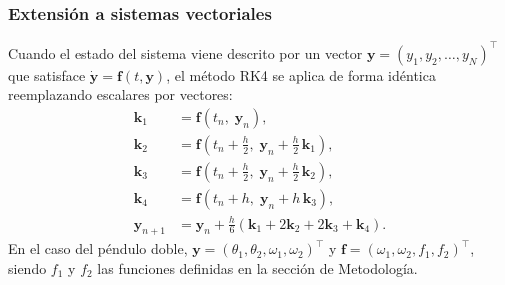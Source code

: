 \documentclass[10pt,onecolumn]{article}
\begin{document}
\subsubsection*{Extensión a sistemas vectoriales}

Cuando el estado del sistema viene descrito por un vector $\mathbf{y} = (y_1, y_2, \ldots, y_N)^{\!\top}$ que satisface $\dot{\mathbf{y}} = \mathbf{f}(t, \mathbf{y})$, el método RK4 se aplica de forma idéntica reemplazando escalares por vectores:
\begin{align}
    \mathbf{k}_1 &= \mathbf{f}(t_n,\; \mathbf{y}_n), \\
    \mathbf{k}_2 &= \mathbf{f}\!\left(t_n + \tfrac{h}{2},\; \mathbf{y}_n + \tfrac{h}{2}\,\mathbf{k}_1\right), \\
    \mathbf{k}_3 &= \mathbf{f}\!\left(t_n + \tfrac{h}{2},\; \mathbf{y}_n + \tfrac{h}{2}\,\mathbf{k}_2\right), \\
    \mathbf{k}_4 &= \mathbf{f}\!\left(t_n + h,\; \mathbf{y}_n + h\,\mathbf{k}_3\right), \\[4pt]
    \mathbf{y}_{n+1} &= \mathbf{y}_n + \frac{h}{6}\left(\mathbf{k}_1 + 2\mathbf{k}_2 + 2\mathbf{k}_3 + \mathbf{k}_4\right).
\end{align}
En el caso del péndulo doble, $\mathbf{y} = (\theta_1, \theta_2, \omega_1, \omega_2)^{\!\top}$ y $\mathbf{f} = (\omega_1, \omega_2, f_1, f_2)^{\!\top}$, siendo $f_1$ y $f_2$ las funciones definidas en la sección de Metodología. 










\end{document}
